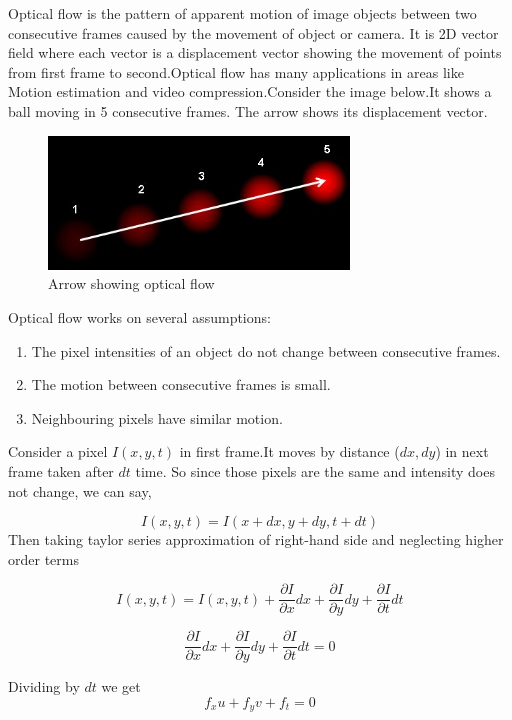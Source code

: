 Optical flow is the pattern of apparent motion of image objects between two consecutive frames caused by the movement of object or camera. It is 2D vector field where each vector is a displacement vector showing the movement of points from first frame to second.Optical flow has many applications in areas like Motion estimation and video compression.Consider the image below.It shows a ball moving in 5 consecutive frames. The arrow shows its displacement vector.

\begin{figure} [!htbp]
\centering
\includegraphics[width=80mm]{Pictures/opticflow.jpg}
\caption{Arrow showing optical flow}
\end{figure}



Optical flow works on several assumptions:
\begin{enumerate}
    \item The pixel intensities of an object do not change between consecutive frames.
    \item The motion between consecutive frames is small. 
    \item Neighbouring pixels have similar motion.
\end{enumerate}

Consider a pixel $I(x,y,t)$  in first frame.It moves by distance ($dx,dy$) in next frame taken after $dt$ time. So since those pixels are the same and intensity does not change, we can say, 

\[I(x,y,t)=I(x+dx,y+dy,t+dt)\]
Then taking taylor series approximation of right-hand side and neglecting higher order terms 


\[I(x,y,t) =I(x,y,t)+\frac{\partial I}{\partial x}dx+\frac{\partial I}{\partial y}dy+\frac{\partial I}{\partial t}dt \] 

\[\frac{\partial I}{\partial x}dx+\frac{\partial I}{\partial y}dy+\frac{\partial I}{\partial t}dt = 0 \]

Dividing by \(dt\) we get 
\begin{equation} \label{eq1}
f_{x}u+f_{y}v+f_{t}=0
\end{equation}


